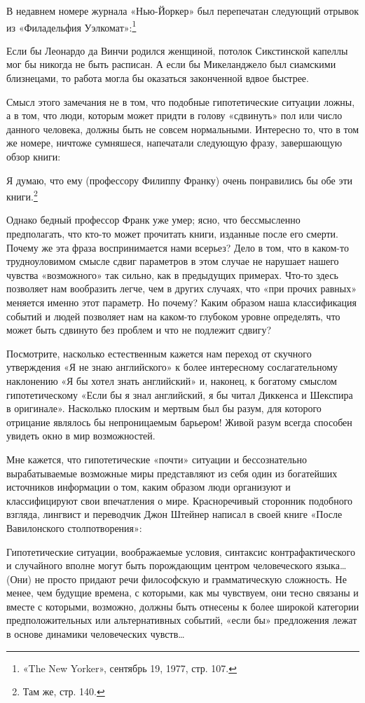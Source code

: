 \documentclass[../main.tex]{subfiles}
\begin{document}
В недавнем номере журнала «Нью-Йоркер» был перепечатан следующий отрывок из «Филадельфия Уэлкомат»:\footnote{«The New Yorker», сентябрь 19, 1977, стр. 107.}

Если бы Леонардо да Винчи родился женщиной, потолок Сикстинской капеллы мог бы никогда не быть расписан. А если бы Микеланджело был сиамскими близнецами, то работа могла бы оказаться законченной вдвое быстрее.

Смысл этого замечания не в том, что подобные гипотетические ситуации ложны, а в том, что люди, которым может придти в голову «сдвинуть» пол или число данного человека, должны быть не совсем нормальными. Интересно то, что в том же номере, ничтоже сумняшеся, напечатали следующую фразу, завершающую обзор книги:

Я думаю, что ему (профессору Филиппу Франку) очень понравились бы обе эти книги.\footnote{Там же, стр. 140.}

Однако бедный профессор Франк уже умер; ясно, что бессмысленно предполагать, что кто-то может прочитать книги, изданные после его смерти. Почему же эта фраза воспринимается нами всерьез? Дело в том, что в каком-то трудноуловимом смысле сдвиг параметров в этом случае не нарушает нашего чувства «возможного» так сильно, как в предыдущих примерах. Что-то здесь позволяет нам вообразить легче, чем в других случаях, что «при прочих равных» меняется именно этот параметр. Но почему? Каким образом наша классификация событий и людей позволяет нам на каком-то глубоком уровне определять, что может быть сдвинуто без проблем и что не подлежит сдвигу?

Посмотрите, насколько естественным кажется нам переход от скучного утверждения «Я не знаю английского» к более интересному сослагательному наклонению «Я бы хотел знать английский» и, наконец, к богатому смыслом гипотетическому «Если бы я знал английский, я бы читал Диккенса и Шекспира в оригинале». Насколько плоским и мертвым был бы разум, для которого отрицание являлось бы непроницаемым барьером! Живой разум всегда способен увидеть окно в мир возможностей.

Мне кажется, что гипотетические «почти» ситуации и бессознательно вырабатываемые возможные миры представляют из себя один из богатейших источников информации о том, каким образом люди организуют и классифицируют свои впечатления о мире. Красноречивый сторонник подобного взгляда, лингвист и переводчик Джон Штейнер написал в своей книге «После Вавилонского столпотворения»:

Гипотетические ситуации, воображаемые условия, синтаксис контрафактического и случайного вполне могут быть порождающим центром человеческого языка\ldots{} (Они) не просто придают речи философскую и грамматическую сложность. Не менее, чем будущие времена, с которыми, как мы чувствуем, они тесно связаны и вместе с которыми, возможно, должны быть отнесены к более широкой категории предположительных или альтернативных событий, «если бы» предложения лежат в основе динамики человеческих чувств\ldots{}
\end{document}
